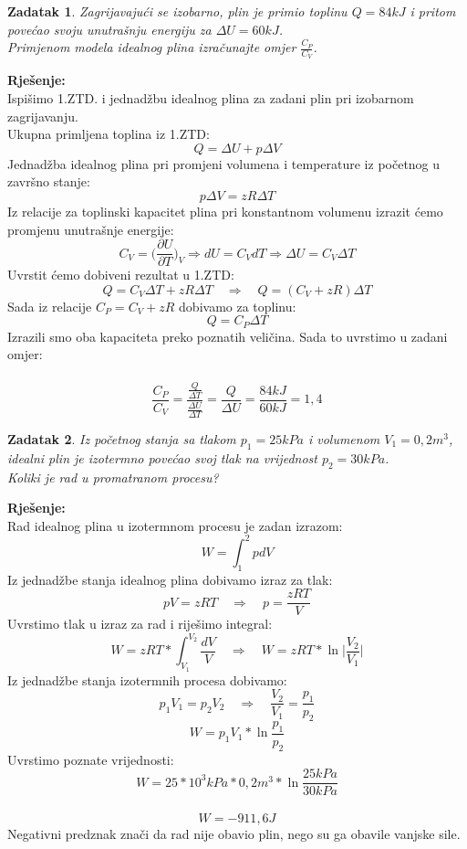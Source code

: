 \documentclass[a4paper,12pt]{article}
\newtheorem{ZDK}{Zadatak}[section]
\begin{document}
\newpage
\begin{ZDK}
	Zagrijavaju\'ci se izobarno, plin je primio toplinu $Q=84kJ$ i pritom pove\'cao svoju unutra\v{s}nju energiju za $\Delta U=60kJ$. \\
	Primjenom modela idealnog plina izra\v{c}unajte omjer $\frac{C_P}{C_V}$.
\end{ZDK}
\textbf{Rje\v{s}enje:} \\
\newline
Ispi\v{s}imo 1.ZTD. i jednad\v{z}bu idealnog plina za zadani plin pri izobarnom zagrijavanju. \\
Ukupna primljena toplina iz 1.ZTD:
$$ Q=\Delta U+p \Delta V $$
Jednad\v{z}ba idealnog plina pri promjeni volumena i temperature iz po\v{c}etnog u zavr\v{s}no stanje:
$$ p\Delta V=zR \Delta T $$
Iz relacije za toplinski kapacitet plina pri konstantnom volumenu izrazit \'cemo promjenu unutra\v{s}nje energije:
$$ C_V=\Big(\frac{\partial U}{\partial T}\Big)_V \Rightarrow dU=C_V dT \Rightarrow \Delta U=C_V \Delta T $$
Uvrstit \'cemo dobiveni rezultat u 1.ZTD:
$$ Q=C_V \Delta T +zR \Delta T \quad \Rightarrow \quad Q=(C_V+zR)\Delta T $$
Sada iz relacije $C_P=C_V+zR$ dobivamo za toplinu:
$$Q=C_P \Delta T$$
Izrazili smo oba kapaciteta preko poznatih veli\v{c}ina. Sada to uvrstimo u zadani omjer:
\\
\\
$$ \frac{C_P}{C_V}=\frac{\frac{Q}{\Delta T}}{\frac{\Delta U}{\Delta T}}=\frac{Q}{\Delta U}=\frac{84kJ}{60kJ}=1,4 $$

\newpage
\begin{ZDK}
	Iz po\v{c}etnog stanja sa tlakom $p_1=25kPa$ i volumenom $V_1=0,2m^3$, idealni plin je izotermno pove\'cao svoj tlak na vrijednost $p_2=30kPa$. \\
	Koliki je rad u promatranom procesu?
\end{ZDK}
\textbf{Rje\v{s}enje:} \\
\newline
Rad idealnog plina u izotermnom procesu je zadan izrazom:
$$ W=\int_{1}^{2}pdV  $$
Iz jednad\v{z}be stanja idealnog plina dobivamo izraz za tlak: 
$$ pV=zRT \quad \Rightarrow \quad p=\frac{zRT}{V} $$
Uvrstimo tlak u izraz za rad i rije\v{s}imo integral:
$$ W=zRT*\int_{V_1}^{V_2}\frac{dV}{V} \quad \Rightarrow \quad W=zRT*\ln{\Big| \frac{V_2}{V_1}  \Big|} $$
Iz jednad\v{z}be stanja izotermnih procesa dobivamo:
$$p_1 V_1=p_2 V_2 \quad \Rightarrow \quad \frac{V_2}{V_1}=\frac{p_1}{p_2} $$
$$ W=p_1 V_1 *\ln{\frac{p_1}{p_2}} $$
Uvrstimo poznate vrijednosti:
$$ W=25*{10}^3kPa*0,2m^3*\ln{\frac{25kPa}{30kPa}} $$
\\
$$ W=-911,6J $$
Negativni predznak zna\v{c}i da rad nije obavio plin, nego su ga obavile vanjske sile.
\end{document}
